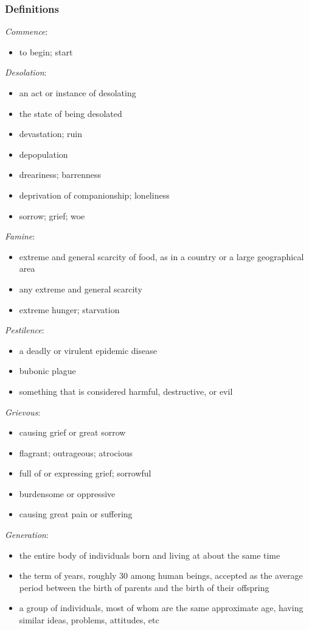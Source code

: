 \documentclass[12pt]{report}
\begin{document}
\subsubsection{Definitions\label{js:DFN12}}
\emph{Commence}: \begin{itemize}
\item to begin; start
\end{itemize}
\emph{Desolation}: \begin{itemize}
\item an act or instance of desolating
\item the state of being desolated
\item devastation; ruin
\item depopulation
\item dreariness; barrenness
\item deprivation of companionship; loneliness
\item sorrow; grief; woe
\end{itemize}
\emph{Famine}: \begin{itemize}
\item extreme and general scarcity of food, as in a country or a large geographical area
\item any extreme and general scarcity
\item extreme hunger; starvation
\end{itemize}
\emph{Pestilence}: \begin{itemize}
\item a deadly or virulent epidemic disease
\item bubonic plague
\item something that is considered harmful, destructive, or evil
\end{itemize}
\emph{Grievous}: \begin{itemize}
\item causing grief or great sorrow
\item flagrant; outrageous; atrocious
\item full of or expressing grief; sorrowful
\item burdensome or oppressive
\item causing great pain or suffering
\end{itemize}
\emph{Generation}: \begin{itemize}
\item the entire body of individuals born and living at about the same time
\item the term of years, roughly 30 among human beings, accepted as the average period between the birth of parents and the birth of their offspring
\item a group of individuals, most of whom are the same approximate age, having similar ideas, problems, attitudes, etc
\end{itemize}
\end{document}
